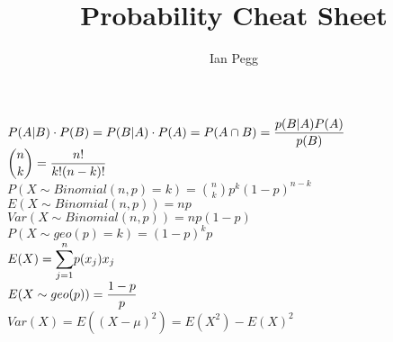 \documentclass[11pt]{article} %
\title{Probability Cheat Sheet}
\author{Ian Pegg}
\begin{document}
\maketitle

$P(A|B) \cdot P(B) = P(B|A) \cdot P(A) = P(A \cap B) = \mathlarger{\frac{p(B|A)P(A)}{p(B)}}$ \\
$\mathlarger{{n \choose k}} = \mathlarger{\frac{n!}{k!(n-k)!}}$ \\
$P(X \sim Binomial(n,p)=k) = {n \choose k} p^k(1-p)^{n-k}$ \\
$E(X \sim Binomial(n,p)) = np$ \\
$Var(X \sim Binomial(n,p)) = np(1-p)$ \\
$P(X \sim geo(p)=k) = (1-p)^{k}p$ \\
$E(X) = \mathlarger{\sum_{j=1}^{n}}p(x_j)x_j$ \\
$E(X \sim geo(p)) = \mathlarger{\frac{1-p}{p}}$ \\
$Var(X) = E((X-\mu)^2) = E(X^2)-E(X)^2$

%
%
%
\end{document}
